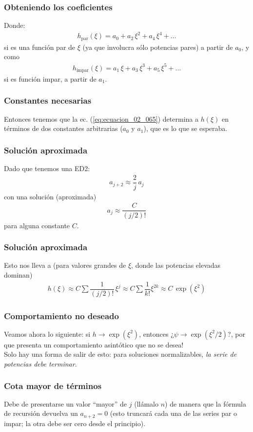 \documentclass[12pt]{beamer}
\begin{document}
\begin{frame}
\frametitle{Obteniendo los coeficientes}
Donde:
\begin{align*}
h_{\text{par}} (\xi) = a_{0} + a_{2} \, \xi^{2} + a_{4} \, \xi^{4} + \ldots
\end{align*}
si es una función par de $\xi$ (ya que involucra sólo potencias pares) a partir de $a_{0}$, \pause y como
\begin{align*}
h_{\text{impar}} (\xi) = a_{1} \, \xi + a_{3} \, \xi^{3} + a_{5} \, \xi^{5} + \ldots
\end{align*}
si es función impar, a partir de $a_{1}$.
\end{frame}
\begin{frame}
\frametitle{Constantes necesarias}
Entonces tenemos que la ec. (\ref{eq:ecuacion_02_065}) determina a $h(\xi)$ en términos de dos constantes arbitrarias ($a_{0}$ y $a_{1}$), que es lo que se esperaba.
\end{frame}
\begin{frame}
\frametitle{Solución aproximada}
Dado que tenemos una ED2:
\pause
\begin{align*}
a_{j+2} \approx \dfrac{2}{j} \, a_{j}
\end{align*}
\pause
con una solución (aproximada)
\begin{align*}
a_{j} \approx \dfrac{C}{(j/2)!}
\end{align*}
para alguna constante $C$.
\end{frame}
\begin{frame}
\frametitle{Solución aproximada}
Esto nos lleva a (para valores grandes de $\xi$, donde las potencias elevadas dominan)
\pause
\begin{align*}
h (\xi) \approx C \sum \dfrac{1}{(j/2)!} \, \xi^{j} \approx C \sum \dfrac{1}{k!} \xi^{2 k} \approx C \, \exp \left( \xi^{2} \right)
\end{align*}
\end{frame}
\begin{frame}
\frametitle{Comportamiento no deseado}
Veamos ahora lo siguiente: si $h \to \exp \left( \xi^{2} \right)$, entonces ¿$\psi \to \exp \left( \xi^{2}/2 \right)$?, por que presenta un comportamiento asintótico que no se desea!
\\
\bigskip
\pause
Solo hay una forma de salir de esto: para soluciones normalizables, \textit{la serie de potencias debe terminar}.
\end{frame}
\begin{frame}
\frametitle{Cota mayor de términos}
Debe de presentarse un valor \enquote{mayor} de $j$ (llámalo $n$) de manera que la fórmula de recursión devuelva un $a_{n+2} = 0$ (esto truncará cada una de las series par o impar; la otra debe ser cero desde el principio). 
\end{frame}
\end{document}
